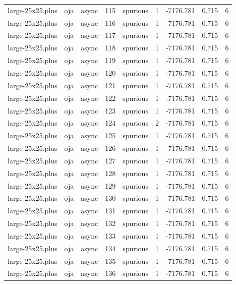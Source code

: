\begin{tabular}{lllrlrrrr}
large-25x25.plus & oja & async & 115 & spurious & 1 & -7176.781 & 0.715 & 6 \\
large-25x25.plus & oja & async & 116 & spurious & 1 & -7176.781 & 0.715 & 6 \\
large-25x25.plus & oja & async & 117 & spurious & 1 & -7176.781 & 0.715 & 6 \\
large-25x25.plus & oja & async & 118 & spurious & 1 & -7176.781 & 0.715 & 6 \\
large-25x25.plus & oja & async & 119 & spurious & 1 & -7176.781 & 0.715 & 6 \\
large-25x25.plus & oja & async & 120 & spurious & 1 & -7176.781 & 0.715 & 6 \\
large-25x25.plus & oja & async & 121 & spurious & 1 & -7176.781 & 0.715 & 6 \\
large-25x25.plus & oja & async & 122 & spurious & 1 & -7176.781 & 0.715 & 6 \\
large-25x25.plus & oja & async & 123 & spurious & 1 & -7176.781 & 0.715 & 6 \\
large-25x25.plus & oja & async & 124 & spurious & 2 & -7176.781 & 0.715 & 6 \\
large-25x25.plus & oja & async & 125 & spurious & 1 & -7176.781 & 0.715 & 6 \\
large-25x25.plus & oja & async & 126 & spurious & 1 & -7176.781 & 0.715 & 6 \\
large-25x25.plus & oja & async & 127 & spurious & 1 & -7176.781 & 0.715 & 6 \\
large-25x25.plus & oja & async & 128 & spurious & 1 & -7176.781 & 0.715 & 6 \\
large-25x25.plus & oja & async & 129 & spurious & 1 & -7176.781 & 0.715 & 6 \\
large-25x25.plus & oja & async & 130 & spurious & 1 & -7176.781 & 0.715 & 6 \\
large-25x25.plus & oja & async & 131 & spurious & 1 & -7176.781 & 0.715 & 6 \\
large-25x25.plus & oja & async & 132 & spurious & 1 & -7176.781 & 0.715 & 6 \\
large-25x25.plus & oja & async & 133 & spurious & 1 & -7176.781 & 0.715 & 6 \\
large-25x25.plus & oja & async & 134 & spurious & 1 & -7176.781 & 0.715 & 6 \\
large-25x25.plus & oja & async & 135 & spurious & 1 & -7176.781 & 0.715 & 6 \\
large-25x25.plus & oja & async & 136 & spurious & 1 & -7176.781 & 0.715 & 6 \\

\end{tabular}
